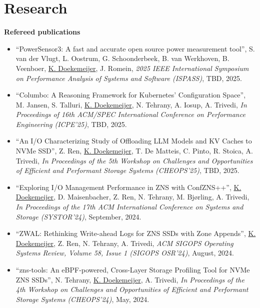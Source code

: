 \documentclass[letterpaper,11pt]{article}
\begin{document}
\section{Research}

\textbf{Refereed publications}
\begin{itemize}[label={}]

\item
  ``PowerSensor3: A fast and accurate open source power measurement tool'', 
  S. van der Vlugt, L. Oostrum, G. Schoonderbeek, B. van Werkhoven, B. Veenboer, \underline{K. Doekemeijer}, J. Romein,
  \textit{2025 IEEE International Symposium on Performance Analysis of Systems and Software (ISPASS)}, 
  TBD, 2025.

\item
  ``Columbo: A Reasoning Framework for Kubernetes’ Configuration Space'', 
  M. Jansen, S. Talluri, \underline{K. Doekemeijer}, N. Tehrany, A. Iosup, A. Trivedi,
  \textit{In Proceedings of 16th ACM/SPEC International Conference on Performance Engineering (ICPE'25)}, 
  TBD, 2025.

\item
  ``An I/O Characterizing Study of Offloading LLM Models and KV Caches to NVMe SSD'', 
  Z. Ren, \underline{K. Doekemeijer}, T. De Matteis,  C. Pinto, R. Stoica, A. Trivedi,
  \textit{In Proceedings of the 5th Workshop on Challenges and Opportunities of Efficient and Performant Storage Systems (CHEOPS'25)}, 
  TBD, 2025.

\item
  ``Exploring I/O Management Performance in ZNS with ConfZNS++'', 
  \underline{K. Doekemeijer}, D. Maisenbacher, Z. Ren, N. Tehrany, M. Bjørling, A. Trivedi,
  \textit{In Proceedings of the 17th ACM International Conference on Systems and Storage (SYSTOR'24)}, 
  September, 2024.

\item
  ``ZWAL: Rethinking Write-ahead Logs for ZNS SSDs with Zone Appends'', 
  \underline{K. Doekemeijer}, Z. Ren, N. Tehrany, A. Trivedi,
  \textit{ACM SIGOPS Operating Systems Review, Volume 58, Issue 1 (SIGOPS OSR'24)}, 
  August, 2024.

\item
  ``zns-tools: An eBPF-powered, Cross-Layer Storage Profiling Tool for NVMe ZNS SSDs'', 
  N. Tehrany, \underline{K. Doekemeijer}, A. Trivedi,
  \textit{In Proceedings of the 4th Workshop on Challenges and Opportunities of Efficient and Performant Storage Systems (CHEOPS'24)},
  May, 2024.


\end{itemize}
\end{document}
